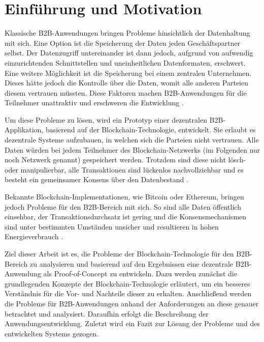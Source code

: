\chapter{Einführung und Motivation}
\label{cha:einfuehrung}

Klassische \acs{B2B}-Anwendungen bringen Probleme hinsichtlich der Datenhaltung mit sich. Eine Option ist die Speicherung der Daten jeden Geschäftspartner selbst. Der Datenzugriff untereinander ist dann jedoch, aufgrund von aufwendig einzurichtenden Schnittstellen und uneinheitlichen Datenformaten, erschwert. Eine weitere Möglichkeit ist die Speicherung bei einem zentralen Unternehmen. Dieses hätte jedoch die Kontrolle über die Daten, womit alle anderen Parteien diesem vertrauen müssten. Diese Faktoren machen \acs{B2B}-Anwendungen für die Teilnehmer unattraktiv und erschweren die Entwicklung \cite{KorpelaDigitalSupplyChain2017}\cite{WustyouneedBlockchain2017}.

Um diese Probleme zu lösen, wird ein Prototyp einer dezentralen \acs{B2B}-Applikation, basierend auf der Blockchain-Technologie, entwickelt. Sie erlaubt es dezentrale Systeme aufzubauen, in welchen sich die Parteien nicht vertrauen. Alle Daten würden bei jedem Teilnehmer des Blockchain-Netzwerks (im Folgenden nur noch Netzwerk genannt) gespeichert werden. Trotzdem sind diese nicht lösch- oder manipulierbar, alle Transaktionen sind lückenlos nachvollziehbar und es besteht ein gemeinsamer Konsens über den Datenbestand \cite{CrosbyBlockChainTechnologyBitcoin2016}.

Bekannte Blockchain-Implementationen, wie Bitcoin oder Ethereum, bringen jedoch Probleme für den \acs{B2B}-Bereich mit sich. So sind alle Daten öffentlich einsehbar, der Transaktionsdurchsatz ist gering und die Konsensmechanismen sind unter bestimmten Umständen unsicher und resultieren in hohen Energieverbrauch \cite{Gramolidangerprivateblockchains2016}\cite{NakamotoBitcoinPeertoPeerElectronic2008}\cite{EthereumTeamEthereumWhitePaper2017}. 

Ziel dieser Arbeit ist es, die Probleme der Blockchain-Technologie für den \acs{B2B}-Bereich zu analysieren und basierend auf den Ergebnissen eine dezentrale \acs{B2B}-Anwendung als Proof-of-Concept zu entwickeln. Dazu werden zunächst die grundlegenden Konzepte der Blockchain-Technologie erläutert, um ein besseres Verständnis für die Vor- und Nachteile dieser zu erhalten. Anschließend werden die Probleme für \acs{B2B}-Anwendungen anhand der Anforderungen an diese genauer betrachtet und analysiert. Daraufhin erfolgt die Beschreibung der Anwendungsentwicklung. Zuletzt wird ein Fazit zur Lösung der Probleme und des entwickelten Systems gezogen.
